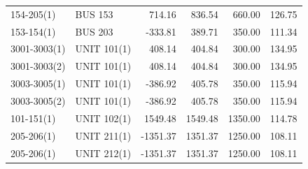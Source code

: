 \documentclass[10pt]{report}
\begin{document}
\begin{table}[H]
{\begin{tabular}{llrrrr}
154-205(1) & BUS 153 & 714.16 & 836.54 & 660.00 & 126.75 \\
153-154(1) & BUS 203 & -333.81 & 389.71 & 350.00 & 111.34 \\
3001-3003(1) & UNIT 101(1) & 408.14 & 404.84 & 300.00 & 134.95 \\
3001-3003(2) & UNIT 101(1) & 408.14 & 404.84 & 300.00 & 134.95 \\
3003-3005(1) & UNIT 101(1) & -386.92 & 405.78 & 350.00 & 115.94 \\
3003-3005(2) & UNIT 101(1) & -386.92 & 405.78 & 350.00 & 115.94 \\
101-151(1) & UNIT 102(1) & 1549.48 & 1549.48 & 1350.00 & 114.78 \\
205-206(1) & UNIT 211(1) & -1351.37 & 1351.37 & 1250.00 & 108.11 \\
205-206(1) & UNIT 212(1) & -1351.37 & 1351.37 & 1250.00 & 108.11 \\
\bottomrule
\end{tabular}}
\end{table}
\end{document}
